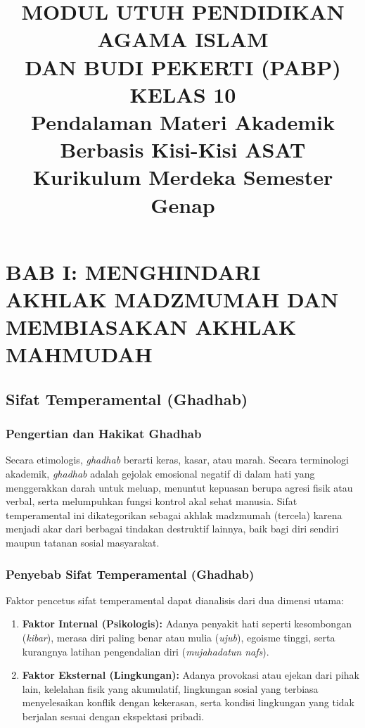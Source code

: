 \documentclass[12pt, a4paper]{article}
\title{\textbf{MODUL UTUH PENDIDIKAN AGAMA ISLAM\\ DAN BUDI PEKERTI (PABP) KELAS 10}\\ \large Pendalaman Materi Akademik Berbasis Kisi-Kisi ASAT\\ Kurikulum Merdeka Semester Genap}
\date{}
\begin{document}
\maketitle

\tableofcontents
\newpage

\section{BAB I: MENGHINDARI AKHLAK MADZMUMAH DAN MEMBIASAKAN AKHLAK MAHMUDAH}

\subsection{Sifat Temperamental (Ghadhab)}

\subsubsection{Pengertian dan Hakikat Ghadhab}
Secara etimologis, \textit{ghadhab} berarti keras, kasar, atau marah. Secara terminologi akademik, \textit{ghadhab} adalah gejolak emosional negatif di dalam hati yang menggerakkan darah untuk meluap, menuntut kepuasan berupa agresi fisik atau verbal, serta melumpuhkan fungsi kontrol akal sehat manusia. Sifat temperamental ini dikategorikan sebagai akhlak madzmumah (tercela) karena menjadi akar dari berbagai tindakan destruktif lainnya, baik bagi diri sendiri maupun tatanan sosial masyarakat.

\subsubsection{Penyebab Sifat Temperamental (Ghadhab)}
Faktor pencetus sifat temperamental dapat dianalisis dari dua dimensi utama:
\begin{enumerate}
    \item \textbf{Faktor Internal (Psikologis):} Adanya penyakit hati seperti kesombongan (\textit{kibar}), merasa diri paling benar atau mulia (\textit{ujub}), egoisme tinggi, serta kurangnya latihan pengendalian diri (\textit{mujahadatun nafs}).
    \item \textbf{Faktor Eksternal (Lingkungan):} Adanya provokasi atau ejekan dari pihak lain, kelelahan fisik yang akumulatif, lingkungan sosial yang terbiasa menyelesaikan konflik dengan kekerasan, serta kondisi lingkungan yang tidak berjalan sesuai dengan ekspektasi pribadi.
\end{enumerate}
\end{document}
